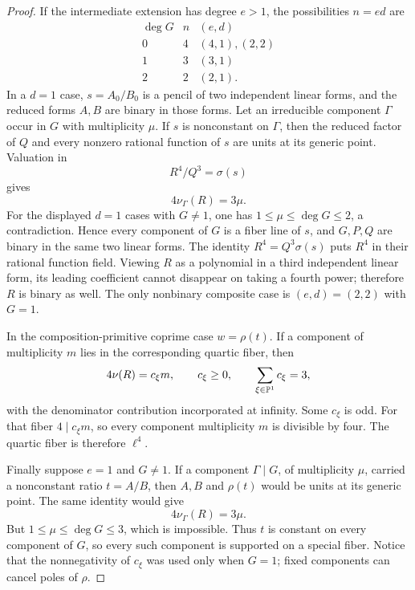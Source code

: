 \documentclass[11pt,reqno]{amsart}
\begin{document}
\begin{proof}
If the intermediate extension has degree \(e>1\), the possibilities
\(n=ed\) are
\[
\begin{array}{c|c|c}
\deg G&n&(e,d)\\ \hline
0&4&(4,1),(2,2)\\
1&3&(3,1)\\
2&2&(2,1).
\end{array}
\]
In a \(d=1\) case, \(s=A_0/B_0\) is a pencil of two independent linear forms,
and the reduced forms \(A,B\) are binary in those forms.  Let an irreducible
component \(\Gamma\) occur in \(G\) with multiplicity \(\mu\).  If \(s\) is
nonconstant on \(\Gamma\), then the reduced factor of \(Q\) and every nonzero
rational function of \(s\) are units at its generic point.  Valuation in
\[
R^4/Q^3=\sigma(s)
\]
gives
\[
4\nu_\Gamma(R)=3\mu.
\]
For the displayed \(d=1\) cases with \(G\ne1\), one has
\(1\le\mu\le\deg G\le2\), a contradiction.  Hence every component of \(G\)
is a fiber line of \(s\), and \(G,P,Q\) are binary in the same two linear
forms.  The identity \(R^4=Q^3\sigma(s)\) puts \(R^4\) in their rational
function field.  Viewing \(R\) as a polynomial in a third independent linear
form, its leading coefficient cannot disappear on taking a fourth power;
therefore \(R\) is binary as well.  The only nonbinary composite case is
\((e,d)=(2,2)\) with \(G=1\).

In the composition-primitive coprime case \(w=\rho(t)\).  If a component of
multiplicity \(m\) lies in the corresponding quartic fiber, then
\[
4\nu(R)=c_\xi m,\qquad c_\xi\ge0,\qquad
\sum_{\xi\in\mathbb P^1}c_\xi=3,
\]
with the denominator contribution incorporated at infinity.  Some
\(c_\xi\) is odd.  For that fiber \(4\mid c_\xi m\), so every component
multiplicity \(m\) is divisible by four.  The quartic fiber is therefore
\(\ell^4\).

Finally suppose \(e=1\) and \(G\ne1\).  If a component \(\Gamma\mid G\), of
multiplicity \(\mu\), carried a nonconstant ratio \(t=A/B\), then \(A,B\)
and \(\rho(t)\) would be units at its generic point.  The same identity would
give
\[
4\nu_\Gamma(R)=3\mu.
\]
But \(1\le\mu\le\deg G\le3\), which is impossible.  Thus \(t\) is constant
on every component of \(G\), so every such component is supported on a
special fiber.  Notice that the nonnegativity of \(c_\xi\) was used only
when \(G=1\); fixed components can cancel poles of \(\rho\).
\end{proof}
\end{document}
